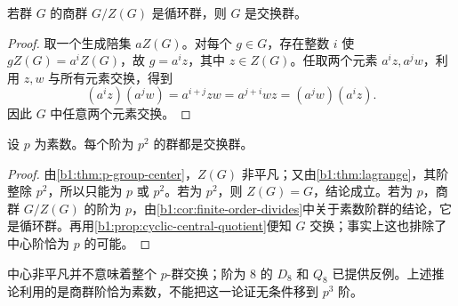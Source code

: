 \begin{proposition}\label{b1:prop:cyclic-central-quotient}
	若群 \(G\) 的商群 \(G/Z(G)\) 是循环群，则 \(G\) 是交换群。
\end{proposition}
\begin{proof}
	取一个生成陪集 \(aZ(G)\)。对每个 \(g\in G\)，存在整数 \(i\) 使 \(gZ(G)=a^iZ(G)\)，故 \(g=a^iz\)，其中 \(z\in Z(G)\)。任取两个元素 \(a^iz,a^jw\)，利用 \(z,w\) 与所有元素交换，得到
	\[
		(a^iz)(a^jw)=a^{i+j}zw=a^{j+i}wz=(a^jw)(a^iz).
	\]
	因此 \(G\) 中任意两个元素交换。
\end{proof}

\begin{corollary}\label{b1:cor:order-p-square-abelian}
	设 \(p\) 为素数。每个阶为 \(p^2\) 的群都是交换群。
\end{corollary}
\begin{proof}
	由\cref{b1:thm:p-group-center}，\(Z(G)\) 非平凡；又由\cref{b1:thm:lagrange}，其阶整除 \(p^2\)，所以只能为 \(p\) 或 \(p^2\)。若为 \(p^2\)，则 \(Z(G)=G\)，结论成立。若为 \(p\)，商群 \(G/Z(G)\) 的阶为 \(p\)，由\cref{b1:cor:finite-order-divides}中关于素数阶群的结论，它是循环群。再用\cref{b1:prop:cyclic-central-quotient}便知 \(G\) 交换；事实上这也排除了中心阶恰为 \(p\) 的可能。
\end{proof}

中心非平凡并不意味着整个 \(p\)-群交换；阶为 \(8\) 的 \(D_8\) 和 \(Q_8\) 已提供反例。上述推论利用的是商群阶恰为素数，不能把这一论证无条件移到 \(p^3\) 阶。
